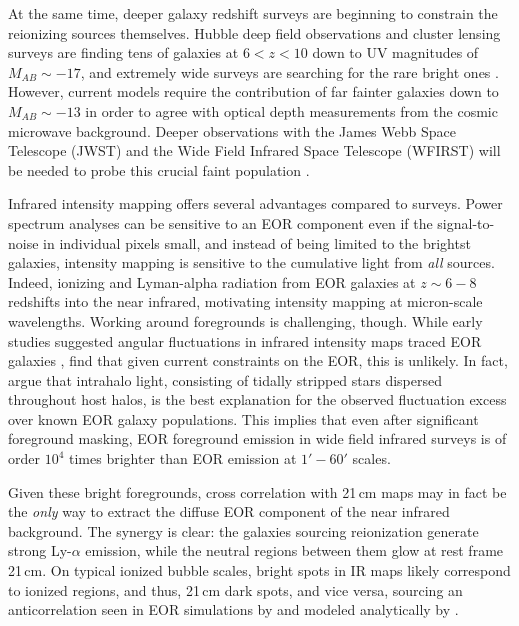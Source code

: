 \documentclass{emulateapj}
\begin{document}
At the same time, deeper galaxy redshift surveys are beginning to constrain the reionizing sources themselves. Hubble deep field observations \citep{Bouwens2011,Illingworth2013,Dunlop2013} and cluster lensing surveys are finding tens of galaxies at $6<z<10$ down to UV magnitudes of $M_{AB}\sim-17$, and extremely wide surveys are searching for the rare bright ones \citep{Schmidt2014,Trenti2011,Bradley2012}. However, current models require the contribution of far fainter galaxies down to $M_{AB}\sim-13$ \citep{Robertson2013,Alvarez2012} in order to agree with optical depth measurements \citep{planck16} from the cosmic microwave background. Deeper observations with the James Webb Space Telescope (JWST) \citep{Gardner2006} and the Wide Field Infrared Space Telescope (WFIRST) \citep{Spergel2013} will be needed to probe this crucial faint population \citep{Atek2015}.

Infrared intensity mapping offers several advantages compared to surveys. Power spectrum analyses can be sensitive to an EOR component even if the signal-to-noise in individual pixels small, and instead of being limited to the brightst galaxies, intensity mapping is sensitive to the cumulative light from \textit{all} sources. Indeed,  ionizing and Lyman-alpha radiation from EOR galaxies at $z\sim6-8$ redshifts into the near infrared, motivating intensity mapping at micron-scale wavelengths. Working around foregrounds is challenging, though. While early studies suggested angular fluctuations in infrared intensity maps traced EOR galaxies \citep[e.g.,][]{kash1,kash2,kash3}, \citet{kash4} find that given current constraints on the EOR, this is unlikely. In fact, \citet{cooray12,zemcov14} argue that intrahalo light, consisting of tidally stripped stars dispersed throughout host halos, is the best explanation for the observed fluctuation excess over known EOR galaxy populations. This implies that even after significant foreground masking, EOR foreground emission in wide field infrared surveys is of order $10^4$ times brighter than EOR emission at $1'-60'$ scales.

Given these bright foregrounds, cross correlation with 21\,cm maps may in fact be the \textit{only} way to extract the diffuse EOR component of the near infrared background. The synergy is clear: the galaxies sourcing reionization generate strong Ly-$\alpha$ emission, while the neutral regions between them glow at rest frame 21\,cm. On typical ionized bubble scales, bright spots in IR maps likely correspond to ionized regions, and thus, 21\,cm dark spots, and vice versa, sourcing an anticorrelation seen in EOR simulations by \citet{silva12,heneka16} and modeled analytically by \citet{feng17}. 
\end{document}
